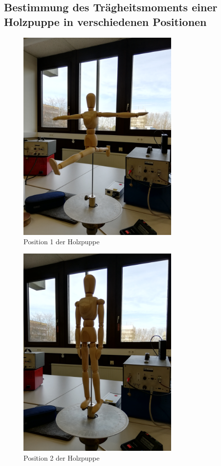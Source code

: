 \subsection{Bestimmung des Trägheitsmoments einer Holzpuppe in verschiedenen Positionen}

\begin{figure}[H]
    \centering
    \includegraphics[width=8cm]{content/4.jpg}
    \caption{Position 1 der Holzpuppe}
    \label{fig:c}
\end{figure}

\begin{figure}[H]
    \centering
    \includegraphics[width=8cm]{content/5.jpg}
    \caption{Position 2 der Holzpuppe}
    \label{fig:d}
\end{figure}


